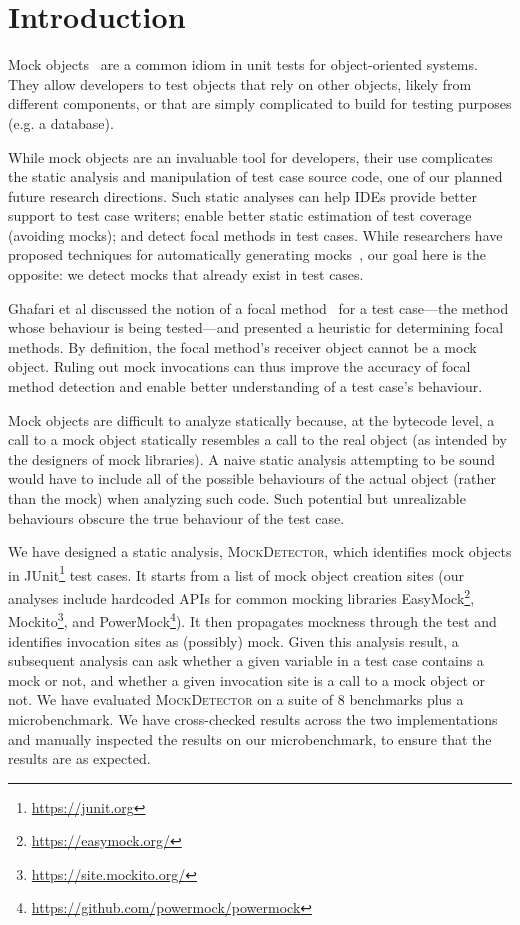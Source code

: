 \section{Introduction}
\label{sec:introduction}

Mock objects~\cite{beck02:_test_driven_devel} are a common idiom in
unit tests for object-oriented systems.  They allow developers to test objects that 
rely on other objects, likely from different components, or that are simply complicated 
to build for testing purposes (e.g. a database).

While mock objects are an invaluable tool for developers, their use
complicates the static analysis and manipulation of test case source code, one of our planned future
research directions. Such static analyses can help IDEs provide better
support to test case writers; enable better static estimation of test coverage
(avoiding mocks); and detect focal methods in test cases. While researchers have
proposed techniques for automatically generating mocks~\cite{alshahwan10:_autom,fazzini20:_framew_autom_test_mockin_mobil_apps}, our goal here is the opposite:
we detect mocks that already exist in test cases.

Ghafari et al discussed the notion of a focal method~\cite{ghafari15:_autom} for a test case---the method
whose behaviour is being tested---and presented a heuristic for determining focal methods.
By definition, the focal method's receiver object cannot be a mock object.
Ruling out mock invocations can thus improve the accuracy of focal method detection and
enable better understanding of a test case's behaviour.

Mock objects are difficult to analyze statically because, at the bytecode level,
a call to a mock object statically resembles a call to the real object (as
intended by the designers of mock libraries).
A naive static analysis attempting to be sound would have to include all of 
the possible behaviours of the actual object (rather than the mock) when analyzing such code. 
Such potential but unrealizable behaviours obscure the true behaviour 
of the test case.

We have designed a static analysis, \textsc{MockDetector}, which identifies
mock objects in JUnit\footnote{\url{https://junit.org}} test cases. It starts from a list of mock object creation sites
(our analyses include hardcoded APIs for common mocking libraries EasyMock\footnote{\url{https://easymock.org/}}, Mockito\footnote{\url{https://site.mockito.org/}}, and PowerMock\footnote{\url{https://github.com/powermock/powermock}}). 
It then propagates mockness
through the test and identifies invocation sites as (possibly) mock.
Given this analysis result, a subsequent analysis
can ask whether a given variable in a test case contains a mock or not, and
whether a given invocation site is a call to a mock object or not. We have
evaluated \textsc{MockDetector} on a suite of 8 benchmarks plus a microbenchmark. 
We have cross-checked results across the two implementations and manually inspected
the results on our microbenchmark, to ensure that the results are as expected.


